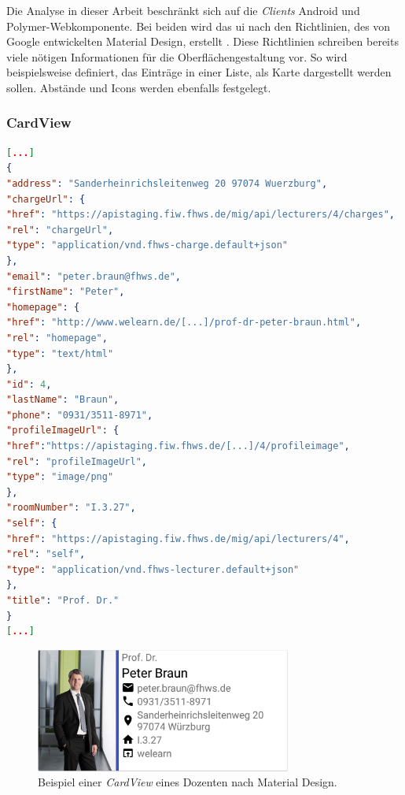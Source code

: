 Die Analyse in dieser Arbeit beschränkt sich auf die \textit{Clients} Android und Polymer-Webkomponente. Bei beiden wird das \acf{ui} nach den Richtlinien, des von Google entwickelten Material Design, erstellt \cite{material}. Diese Richtlinien schreiben bereits viele nötigen Informationen für die Oberflächengestaltung vor. So wird beispielsweise definiert, das Einträge in einer Liste, als Karte dargestellt werden sollen. Abstände und Icons werden ebenfalls festgelegt.

\subsubsection{CardView}


\begin{lstlisting}[label=lst:braun_json,
language=json,
firstnumber=1,
caption=Demo Daten eines Dozenten.]	
[...]	   
{
"address": "Sanderheinrichsleitenweg 20 97074 Wuerzburg",
"chargeUrl": {
"href": "https://apistaging.fiw.fhws.de/mig/api/lecturers/4/charges",
"rel": "chargeUrl",
"type": "application/vnd.fhws-charge.default+json"
},
"email": "peter.braun@fhws.de",
"firstName": "Peter",
"homepage": {
"href": "http://www.welearn.de/[...]/prof-dr-peter-braun.html",
"rel": "homepage",
"type": "text/html"
},
"id": 4,
"lastName": "Braun",
"phone": "0931/3511-8971",
"profileImageUrl": {
"href":"https://apistaging.fiw.fhws.de/[...]/4/profileimage",
"rel": "profileImageUrl",
"type": "image/png"
},
"roomNumber": "I.3.27",
"self": {
"href": "https://apistaging.fiw.fhws.de/mig/api/lecturers/4",
"rel": "self",
"type": "application/vnd.fhws-lecturer.default+json"
},
"title": "Prof. Dr."
}
[...]
\end{lstlisting}

\begin{figure}[H]
	\begin{center}
		\includegraphics[width=0.75\textwidth]{images/card.png}
		\caption{Beispiel einer \textit{CardView} eines Dozenten nach Material Design.}
		\label{fig:card}
	\end{center}
\end{figure}

